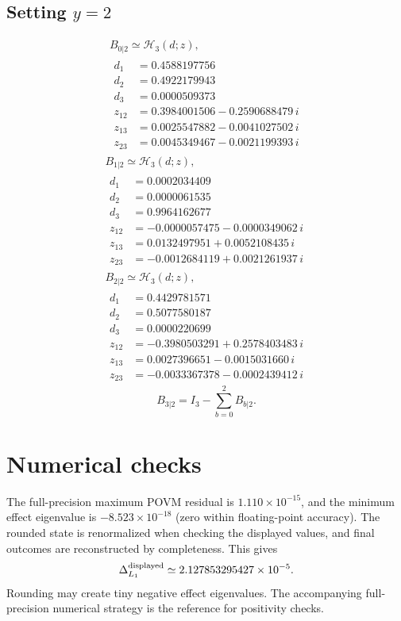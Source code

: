 \documentclass[11pt]{article}
\begin{document}
\subsection*{Setting $y=2$}
\[
\begin{gathered}
B_{0|2}\simeq\mathcal H_3(d;z),\\[3pt]
\begin{aligned}
d_1&=0.4588197756 \\
d_2&=0.4922179943 \\
d_3&=0.0000509373 \\
z_{12}&=0.3984001506-0.2590688479\,i \\
z_{13}&=0.0025547882-0.0041027502\,i \\
z_{23}&=0.0045349467-0.0021199393\,i
\end{aligned}
\end{gathered}
\]
\[
\begin{gathered}
B_{1|2}\simeq\mathcal H_3(d;z),\\[3pt]
\begin{aligned}
d_1&=0.0002034409 \\
d_2&=0.0000061535 \\
d_3&=0.9964162677 \\
z_{12}&=-0.0000057475-0.0000349062\,i \\
z_{13}&=0.0132497951+0.0052108435\,i \\
z_{23}&=-0.0012684119+0.0021261937\,i
\end{aligned}
\end{gathered}
\]
\[
\begin{gathered}
B_{2|2}\simeq\mathcal H_3(d;z),\\[3pt]
\begin{aligned}
d_1&=0.4429781571 \\
d_2&=0.5077580187 \\
d_3&=0.0000220699 \\
z_{12}&=-0.3980503291+0.2578403483\,i \\
z_{13}&=0.0027396651-0.0015031660\,i \\
z_{23}&=-0.0033367378-0.0002439412\,i
\end{aligned}
\end{gathered}
\]
\[
B_{3|2}=I_3-\sum_{b=0}^2 B_{b|2}.
\]
\section{Numerical checks}
The full-precision maximum POVM residual is $1.110\times10^{-15}$,
and the minimum effect eigenvalue is $-8.523\times10^{-18}$
(zero within floating-point accuracy). The rounded state is renormalized
when checking the displayed values, and final outcomes are reconstructed
by completeness. This gives
\[
\Delta_{L_1}^{\rm displayed}\simeq 2.127853295427\times10^{-5}.
\]
Rounding may create tiny negative effect eigenvalues. The accompanying
full-precision numerical strategy is the reference for positivity checks.
\end{document}
